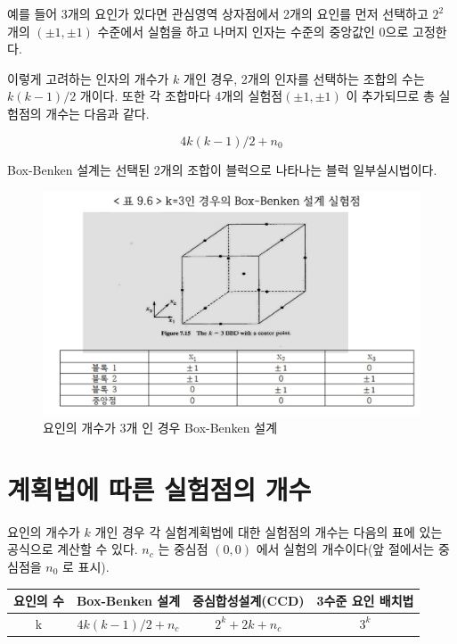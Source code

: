 \documentclass[
]{book}
\theoremstyle{definition}
\theoremstyle{definition}
\theoremstyle{definition}
\theoremstyle{definition}
\theoremstyle{remark}
\begin{document}
예를 들어 3개의 요인가 있다면 관심영역 상자점에서 2개의 요인를 먼저 선택하고 \(2^2\) 개의 \((\pm 1, \pm1)\) 수준에서 실험을 하고 나머지 인자는 수준의 중앙값인 0으로 고정한다.

이렇게 고려하는 인자의 개수가 \(k\) 개인 경우, 2개의 인자를 선택하는 조합의 수는 \(k(k-1)/2\) 개이다. 또한 각 조합마다 4개의 실험점\((\pm 1, \pm1)\) 이 추가되므로 총 실험점의 개수는 다음과 같다.

\[ 4k(k-1)/2 + n_0 \]

Box-Benken 설계는 선택된 2개의 조합이 블럭으로 나타나는 블럭 일부실시법이다.

\begin{figure}

{\centering \includegraphics[width=0.8\linewidth]{myimages/boxbenken} 

}

\caption{요인의 개수가 3개 인 경우 Box-Benken 설계}\label{fig:unnamed-chunk-28}
\end{figure}

\hypertarget{uxacc4uxd68duxbc95uxc5d0-uxb530uxb978-uxc2e4uxd5d8uxc810uxc758-uxac1cuxc218}{%
\section{계획법에 따른 실험점의 개수}\label{uxacc4uxd68duxbc95uxc5d0-uxb530uxb978-uxc2e4uxd5d8uxc810uxc758-uxac1cuxc218}}

요인의 개수가 \(k\) 개인 경우 각 실험계획법에 대한 실험점의 개수는 다음의 표에 있는 공식으로 계산할 수 있다. \(n_c\) 는 중심점 \((0,0)\) 에서 실험의 개수이다(앞 절에서는 중심점을 \(n_0\) 로 표시).

\begin{longtable}[]{@{}cccc@{}}
\toprule
요인의 수 & Box-Benken 설계 & 중심합성설계(CCD) & 3수준 요인 배치법\tabularnewline
\midrule
\endhead
k & \(4k(k-1)/2 + n_c\) & \(2^k+2k + n_c\) & \(3^k\)\tabularnewline
\bottomrule
\end{longtable}
\end{document}
